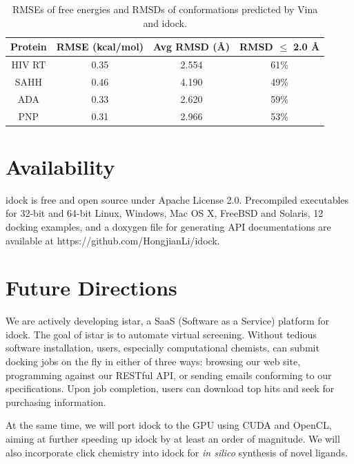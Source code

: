 \documentclass[10pt,conference,compsocconf]{../IEEEtran}
\begin{document}
\begin{table}
\centering
\begin{tabular*}
{\linewidth}
{@{\extracolsep{\fill}}cccc}
\toprule
Protein & RMSE (kcal/mol) & Avg RMSD (\AA) & RMSD $\leq$ 2.0 \AA\\
\midrule
HIV RT & 0.35 & 2.554 & 61\%\\
SAHH   & 0.46 & 4.190 & 49\%\\
ADA    & 0.33 & 2.620 & 59\%\\
PNP    & 0.31 & 2.966 & 53\%\\
\bottomrule
\end{tabular*}
\caption{RMSEs of free energies and RMSDs of conformations predicted by Vina and idock.}
\label{tab:RMSEAndRMSD}
\end{table}

\section{Availability}

idock is free and open source under Apache License 2.0. Precompiled executables for 32-bit and 64-bit Linux, Windows, Mac OS X, FreeBSD and Solaris, 12 docking examples, and a doxygen file for generating API documentations are available at https://github.com/HongjianLi/idock.

\section{Future Directions}

We are actively developing istar, a SaaS (Software as a Service) platform for idock. The goal of istar is to automate virtual screening. Without tedious software installation, users, especially computational chemists, can submit docking jobs on the fly in either of three ways: browsing our web site, programming against our RESTful API, or sending emails conforming to our specifications. Upon job completion, users can download top hits and seek for purchasing information.

At the same time, we will port idock to the GPU using CUDA and OpenCL, aiming at further speeding up idock by at least an order of magnitude. We will also incorporate click chemistry into idock for \textit{in silico} synthesis of novel ligands.



\end{document}
